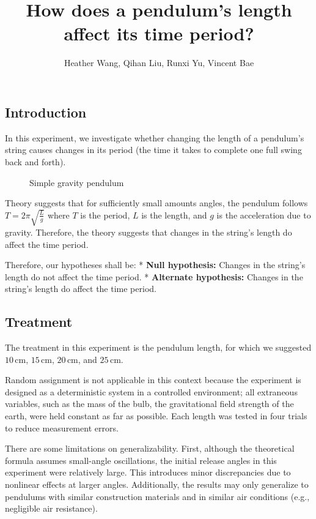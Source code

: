\documentclass[
]{article}
\title{How does a pendulum's length affect its time period?}
\author{Heather Wang, Qihan Liu, Runxi Yu, Vincent Bae}
\date{}
\begin{document}
\maketitle

\subsection{Introduction}\label{introduction}

In this experiment, we investigate whether changing the length of a
pendulum's string causes changes in its period (the time it takes to
complete one full swing back and forth).

\begin{figure}
\centering

\caption{Simple gravity pendulum}
\end{figure}

Theory suggests that for sufficiently small amounts angles, the pendulum
follows \(T = 2\pi\sqrt{\frac{L}{g}}\) where \(T\) is the period, \(L\)
is the length, and \(g\) is the acceleration due to gravity. Therefore,
the theory suggests that changes in the string's length do affect the
time period.

Therefore, our hypotheses shall be: * \textbf{Null hypothesis:} Changes
in the string's length do not affect the time period. *
\textbf{Alternate hypothesis:} Changes in the string's length do affect
the time period.

\subsection{Treatment}\label{treatment}

The treatment in this experiment is the pendulum length, for which we
suggested \(10\,\mathrm{cm}\), \(15\,\mathrm{cm}\), \(20\,\mathrm{cm}\),
and \(25\,\mathrm{cm}\).

Random assignment is not applicable in this context because the
experiment is designed as a deterministic system in a controlled
environment; all extraneous variables, such as the mass of the bulb, the
gravitational field strength of the earth, were held constant as far as
possible. Each length was tested in four trials to reduce measurement
errors.

There are some limitations on generalizability. First, although the
theoretical formula assumes small-angle oscillations, the initial
release angles in this experiment were relatively large. This introduces
minor discrepancies due to nonlinear effects at larger angles.
Additionally, the results may only generalize to pendulums with similar
construction materials and in similar air conditions (e.g., negligible
air resistance).
\end{document}
